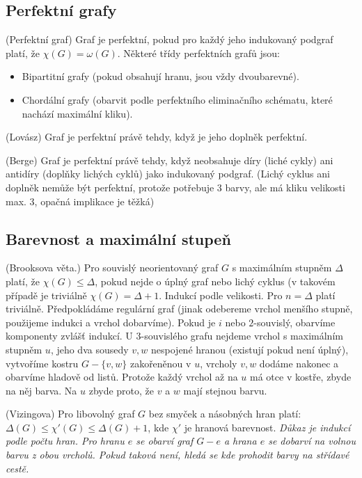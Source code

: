 
\subsection{Perfektní grafy}

\df (Perfektní graf) Graf je perfektní, pokud pro každý jeho indukovaný podgraf 
platí, že $\chi(G) = \omega(G)$. Některé třídy perfektních grafů jsou:
\begin{itemize}
	\item Bipartitní grafy (pokud obsahují hranu, jsou vždy dvoubarevné).
	\item Chordální grafy (obarvit podle perfektního eliminačního schématu, 
		které nachází maximální kliku).
\end{itemize}

\vt (Lovász) Graf je perfektní právě tehdy, když je jeho doplněk perfektní.

\vt (Berge) Graf je perfektní právě tehdy, když neobsahuje díry (liché cykly) 
ani antidíry (doplňky lichých cyklů) jako indukovaný podgraf.  (Lichý cyklus ani 
doplněk nemůže být perfektní, protože potřebuje 3 barvy, ale má kliku velikosti 
max. 3, opačná implikace je těžká)

\subsection{Barevnost a maximální stupeň}

\vt (Brooksova věta.) Pro souvislý neorientovaný graf $G$ s maximálním stupněm 
$\Delta$ platí, že $\chi(G) \leq \Delta$, pokud nejde o úplný graf nebo lichý 
cyklus (v takovém případě je triviálně $\chi(G) = \Delta+1$.
\dk Indukcí podle velikosti. Pro $n = \Delta$ platí triviálně.  Předpokládáme 
regulární graf (jinak odebereme vrchol menšího stupně, použijeme indukci a 
vrchol dobarvíme). Pokud je $i$ nebo $2$-souvislý, obarvíme komponenty zvlášť 
indukcí. U 3-souvislého grafu nejdeme vrchol s maximálním stupněm $u$, jeho dva 
sousedy $v,w$ nespojené hranou (existují pokud není úplný), vytvoříme kostru 
$G-\{v,w\}$ zakořeněnou v $u$, vrcholy $v,w$ dodáme nakonec a obarvíme hladově 
od listů.  Protože každý vrchol až na $u$ má otce v kostře, zbyde na něj
barva. Na $u$ zbyde proto, že $v$ a $w$ mají stejnou barvu.

\vt (Vizingova) Pro libovolný graf $G$ bez smyček a násobných hran platí: 
$\Delta(G) \leq \chi'(G) \leq \Delta(G) +1$, kde $\chi'$ je hranová barevnost.
{\it Důkaz je indukcí podle počtu hran. Pro hranu $e$ se obarví graf $G-e$ a 
	hrana $e$ se dobarví na volnou barvu z obou vrcholů. Pokud taková není, 
hledá se kde prohodit barvy na střídavé cestě.}


